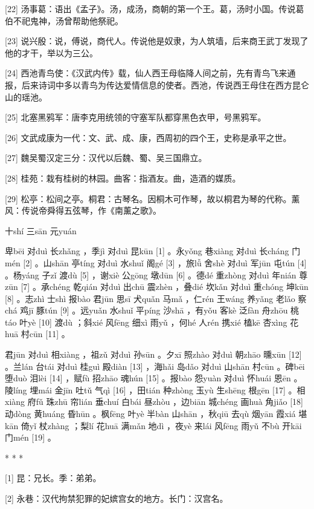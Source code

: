 \documentclass[12pt,UTF8]{ctexbook}
\begin{document}
[22] 汤事葛：语出《孟子》。汤，成汤，商朝的第一个王。葛，汤时小国。传说葛伯不祀鬼神，汤曾帮助他祭祀。

[23] 说兴殷：说，傅说，商代人。传说他是奴隶，为人筑墙，后来商王武丁发现了他的才干，举以为三公。

[24] 西池青鸟使：《汉武内传》载，仙人西王母临降人间之前，先有青鸟飞来通报，后来诗词中多以青鸟为传达爱情信息的使者。西池，传说西王母住在西方昆仑山的瑶池。

[25] 北塞黑鸦军：唐李克用统领的守塞军队都穿黑色衣甲，号黑鸦军。

[26] 文武成康为一代：文、武、成、康，西周初的四个王，史称是承平之世。

[27] 魏吴蜀汉定三分：汉代以后魏、蜀、吴三国鼎立。

[28] 桂苑：栽有桂树的林园。曲客：指酒友。曲，造酒的媒质。

[29] 松亭：松间之亭。桐君：古琴名。因桐木可作琴，故以桐君为琴的代称。薰风：传说帝舜得五弦琴，作《南薰之歌》。





十shí 三sān 元yuán


卑bēi 对duì 长zhǎng ，季jì 对duì 昆kūn [1] 。永yǒng 巷xiàng 对duì 长cháng 门mén [2] 。山shān 亭tíng 对duì 水shuǐ 阁gé [3] ，旅lǚ 舍shè 对duì 军jūn 屯tún [4] 。杨yáng 子zǐ 渡dù [5] ，谢xiè 公gōng 墩dūn [6] 。德dé 重zhòng 对duì 年nián 尊zūn [7] 。承chéng 乾qián 对duì 出chū 震zhèn ，叠dié 坎kǎn 对duì 重chóng 坤kūn [8] 。志zhì 士shì 报bào 君jūn 思sī 犬quǎn 马mǎ ，仁rén 王wáng 养yǎng 老lǎo 察chá 鸡jī 豚tún [9] 。远yuǎn 水shuǐ 平píng 沙shā ，有yǒu 客kè 泛fàn 舟zhōu 桃táo 叶yè [10] 渡dù ；斜xié 风fēng 细xì 雨yǔ ，何hé 人rén 携xié 榼kē 杏xìng 花huā 村cūn [11] 。

君jūn 对duì 相xiàng ，祖zǔ 对duì 孙sūn 。夕xī 照zhào 对duì 朝zhāo 曛xūn [12] 。兰lán 台tái 对duì 桂guì 殿diàn [13] ，海hǎi 岛dǎo 对duì 山shān 村cūn 。碑bēi 堕duò 泪lèi [14] ，赋fù 招zhāo 魂hún [15] 。报bào 怨yuàn 对duì 怀huái 恩ēn 。陵líng 埋mái 金jīn 吐tǔ 气qì [16] ，田tián 种zhòng 玉yù 生shēng 根gēn [17] 。相xiàng 府fǔ 珠zhū 帘lián 垂chuí 白bái 昼zhòu ，边biān 城chéng 画huà 角jiǎo [18] 动dòng 黄huáng 昏hūn 。枫fēng 叶yè 半bàn 山shān ，秋qiū 去qù 烟yān 霞xiá 堪kān 倚yǐ 杖zhàng ；梨lí 花huā 满mǎn 地dì ，夜yè 来lái 风fēng 雨yǔ 不bù 开kāi 门mén [19] 。



* * *



[1] 昆：兄长。季：弟弟。

[2] 永巷：汉代拘禁犯罪的妃嫔宫女的地方。长门：汉宫名。
\end{document}
